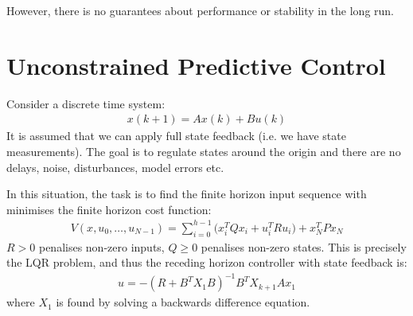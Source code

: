 \documentclass[a4paper]{book}
\newcommand{\ix}[1]{%
  \leavevmode %
  \marginpar{\small\emph{#1}}%
}
\begin{document}
However, there is no guarantees about performance or stability in the long run. 

\section{Unconstrained Predictive Control}
Consider a discrete time system:
\begin{align}
x(k+1) = Ax(k) + Bu(k)
\end{align}
\ix{Assumptions}It is assumed that we can apply full state feedback (i.e. we have state measurements). The goal is to regulate states around the origin and there are no delays, noise, disturbances, model errors etc. 

\ix{Task}In this situation, the task is to find the finite horizon input sequence with minimises the finite horizon cost function:
\begin{align}
V(x, u_0, \ldots, u_{N-1}) = \sum_{i=0}^{h-1} \Big( x_i^T Q x_i + u_i^T R u_i \Big) + x_N^T P x_N
\end{align}
$R > 0$ penalises non-zero inputs, $Q \geq 0$ penalises non-zero states. This is precisely the LQR problem, and thus the receding horizon controller with state feedback is:
\begin{align}
u = -(R + B^T X_{1} B)^{-1} B^T X_{k+1} A x_1
\end{align}
where $X_1$ is found by solving a backwards difference equation. 
\end{document}

